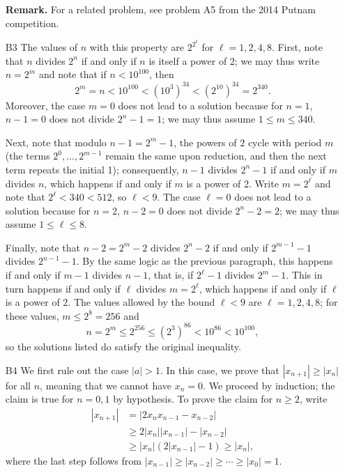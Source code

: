 \documentclass[amssymb,twocolumn,pra,10pt,aps]{revtex4-1}
\begin{document}
\begin{itemize}
\noindent
\textbf{Remark.}
For a related problem, see problem A5 from the 2014 Putnam competition.

\item[B3]
The values of $n$ with this property are $2^{2^\ell}$ for $\ell = 1,2,4,8$.
First, note that $n$ divides $2^n$ if and only if $n$ is itself a power of 2; we may thus write $n = 2^m$ and note that
if $n<10^{100}$, then
\[
2^m = n < 10^{100} < (10^3)^{34} < (2^{10})^{34} = 2^{340}.
\]
Moreover, the case $m=0$ does not lead to a solution because for $n=1$, $n-1 = 0$ does not divide $2^n-1 = 1$; we 
may thus assume $1 \leq m \leq 340$.

Next, note that modulo $n-1 = 2^m-1$, the powers of $2$ cycle with period $m$ (the terms
$2^0, \dots, 2^{m-1}$ remain the same upon reduction, and then the next term repeats the initial 1); consequently,
$n-1$ divides $2^n-1$ if and only if $m$ divides $n$, which happens if and only if $m$ is a power of 2.
Write $m = 2^\ell$ and note that $2^\ell < 340 < 512$, so $\ell < 9$. The case $\ell=0$ does not lead to a solution because for $n=2$, $n-2 =0$ does not divide $2^n-2 = 2$; we may thus assume $1 \leq \ell \leq 8$.

Finally, note that $n-2 = 2^m-2$ divides $2^n-2$ if and only if $2^{m-1} - 1$ divides $2^{n-1} - 1$.
By the same logic as the previous paragraph, this happens if and only if $m-1$ divides $n-1$,
that is, if $2^\ell - 1$ divides $2^m-1$. This in turn happens if and only if $\ell$ divides $m = 2^\ell$,
which happens if and only if $\ell$ is a power of 2. The values allowed by the bound $\ell < 9$ are
$\ell = 1,2,4,8$; for these values, $m \leq 2^8 = 256$ and
\[
n = 2^m \leq 2^{256} \leq (2^3)^{86} < 10^{86} < 10^{100},
\]
so the solutions listed do satisfy the original inequality.

\item[B4]
We first rule out the case $|a|>1$. In this case, we prove that $|x_{n+1}| \geq |x_n|$ for all $n$, meaning that we cannot have $x_n = 0$. We proceed by induction; the claim is true for $n=0,1$ by hypothesis. To prove the claim for  $n \geq 2$, write
\begin{align*}
|x_{n+1}| &= |2x_nx_{n-1}-x_{n-2}| \\
&\geq 2|x_n||x_{n-1}|-|x_{n-2}| \\
&\geq |x_n|(2|x_{n-1}|-1) \geq |x_n|,
\end{align*} 
where the last step follows from $|x_{n-1}| \geq |x_{n-2}| \geq \cdots \geq |x_0| = 1$.


\end{itemize}
\end{document}

